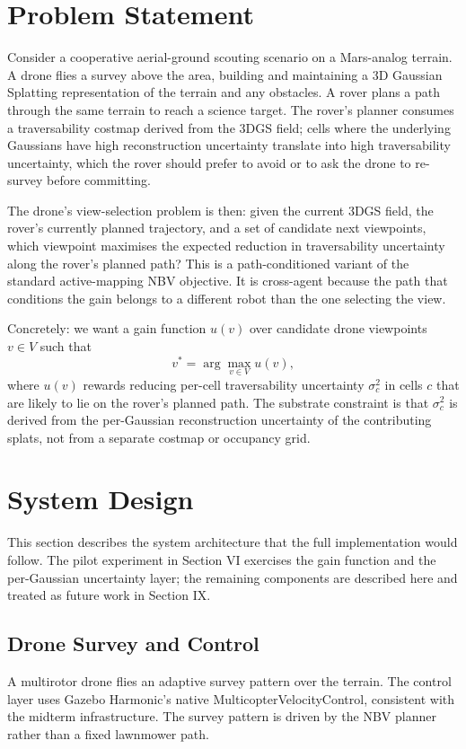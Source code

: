 \documentclass[conference]{IEEEtran}
\begin{document}
\section{Problem Statement}
Consider a cooperative aerial-ground scouting scenario on a Mars-analog terrain. A drone flies a survey above the area, building and maintaining a 3D Gaussian Splatting representation of the terrain and any obstacles. A rover plans a path through the same terrain to reach a science target. The rover's planner consumes a traversability costmap derived from the 3DGS field; cells where the underlying Gaussians have high reconstruction uncertainty translate into high traversability uncertainty, which the rover should prefer to avoid or to ask the drone to re-survey before committing.

The drone's view-selection problem is then: given the current 3DGS field, the rover's currently planned trajectory, and a set of candidate next viewpoints, which viewpoint maximises the expected reduction in traversability uncertainty along the rover's planned path? This is a path-conditioned variant of the standard active-mapping NBV objective. It is cross-agent because the path that conditions the gain belongs to a different robot than the one selecting the view.

Concretely: we want a gain function $u(v)$ over candidate drone viewpoints $v \in V$ such that
\begin{equation}
v^* = \arg\max_{v \in V} u(v),
\end{equation}
where $u(v)$ rewards reducing per-cell traversability uncertainty $\sigma^2_c$ in cells $c$ that are likely to lie on the rover's planned path. The substrate constraint is that $\sigma^2_c$ is derived from the per-Gaussian reconstruction uncertainty of the contributing splats, not from a separate costmap or occupancy grid.

\section{System Design}
This section describes the system architecture that the full implementation would follow. The pilot experiment in Section VI exercises the gain function and the per-Gaussian uncertainty layer; the remaining components are described here and treated as future work in Section IX.

\subsection{Drone Survey and Control}
A multirotor drone flies an adaptive survey pattern over the terrain. The control layer uses Gazebo Harmonic's native MulticopterVelocityControl, consistent with the midterm infrastructure. The survey pattern is driven by the NBV planner rather than a fixed lawnmower path.
\end{document}
